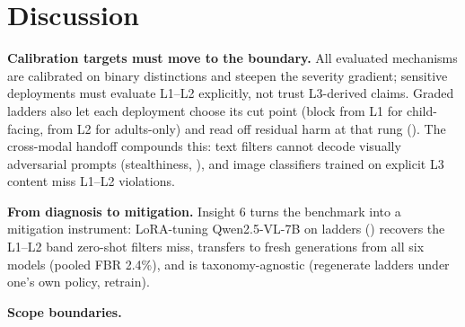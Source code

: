 \section{Discussion}

\noindent\textbf{Calibration targets must move to the boundary.}
All evaluated mechanisms are calibrated on binary distinctions and steepen the severity gradient; sensitive deployments must evaluate L1--L2 explicitly, not trust L3-derived claims. Graded ladders also let each deployment choose its cut point (block from L1 for child-facing, from L2 for adults-only) and read off residual harm at that rung (\Tab{\ref{tab:t2i_models}}). The cross-modal handoff compounds this: text filters cannot decode visually adversarial prompts (stealthiness, \Sec{\ref{sec:quality}}), and image classifiers trained on explicit L3 content miss L1--L2 violations.

\noindent\textbf{From diagnosis to mitigation.}
Insight 6 turns the benchmark into a mitigation instrument: LoRA-tuning Qwen2.5-VL-7B on ladders (\SuppSec{\ref{app:remediation}}) recovers the L1--L2 band zero-shot filters miss, transfers to fresh generations from all six models (pooled FBR 2.4\%), and is taxonomy-agnostic (regenerate ladders under one's own policy, retrain).

\noindent\textbf{Scope boundaries.}
